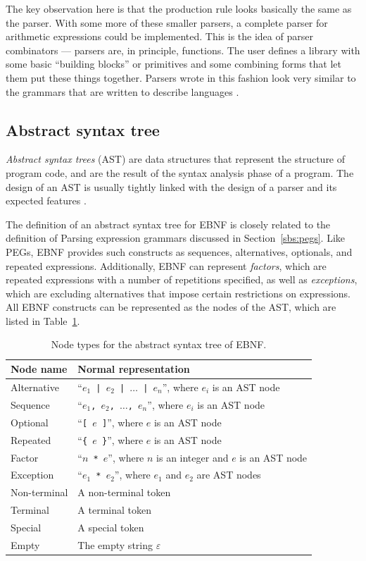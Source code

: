 \documentclass[english,bachelors,forcepolishlogotype]{wizthesis}
\begin{document}
The key observation here is that the production rule looks basically
the same as the parser. With some more of these smaller parsers, a complete
parser for arithmetic expressions could be implemented. This is the idea of
parser combinators --- parsers are, in principle, functions. The user defines a
library with some basic ``building blocks'' or primitives and some combining
forms that let them put these things together. Parsers wrote in this fashion
look very similar to the grammars that are written to describe languages
\cite{fokker-1995,leijen-2001}.

\subsection{Abstract syntax tree} \label{sbs:ast}

\emph{Abstract syntax trees} (AST) are data structures that represent the
structure of program code, and are the result of the syntax analysis phase of a
program. The design of an AST is usually tightly linked with the design of a
parser and its expected features \cite{aho-2019}.

The definition of an abstract syntax tree for EBNF is closely related to the
definition of Parsing expression grammars discussed in Section~\ref{sbs:pegs}.
Like PEGs, EBNF provides such constructs as sequences, alternatives, optionals,
and repeated expressions. Additionally, EBNF can represent \emph{factors}, which
are repeated expressions with a number of repetitions specified, as well as
\emph{exceptions}, which are excluding alternatives that impose certain
restrictions on expressions. All EBNF constructs can be represented as the nodes
of the AST, which are listed in Table~\ref{tab:ast-nodes}.

\begin{longtable}[c]{@{}lm{9cm}@{}}
  \caption{Node types for the abstract syntax tree of EBNF.}
  \label{tab:ast-nodes}\\
  \toprule
  Node name           & Normal representation \\* \midrule
  \endfirsthead
  \endhead
  \endfoot
  \endlastfoot
  Alternative  & ``\texttt{$e_1$ | $e_2$ | $\dots$ | $e_n$}'', where $e_i$ is an AST node \\
  Sequence     & ``\texttt{$e_1$, $e_2$, $\dots$, $e_n$}'', where $e_i$ is an AST node \\
  Optional     & ``\texttt{[ $e$ ]}'', where $e$ is an AST node \\
  Repeated     & ``\texttt{\{ $e$ \}}'', where $e$ is an AST node \\
  Factor       & ``\texttt{$n$ * $e$}'', where $n$ is an integer and $e$ is an AST node \\
  Exception    & ``\texttt{$e_1$ * $e_2$}'', where $e_1$ and $e_2$ are AST nodes \\
  Non-terminal & A non-terminal token \\
  Terminal     & A terminal token \\
  Special      & A special token \\
  Empty        & The empty string $\varepsilon$ \\* \bottomrule
\end{longtable}
\end{document}
